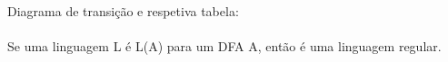 \documentclass[../resumosTCOM.tex]{subfiles}
\begin{document}
\paragraph{}

Diagrama de transição e respetiva tabela:
\begin{figure}[H]
    \centering
    \qquad
    \label{fig:dfa}%
\end{figure}

\paragraph{}

Se uma linguagem L é L(A) para um DFA A, então é uma linguagem regular.
\end{document}

